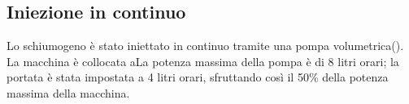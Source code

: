 
\subsection{Iniezione in continuo}
Lo schiumogeno è stato iniettato in continuo tramite una pompa volumetrica(). La macchina è collocata aLa potenza massima della pompa è di 8 litri orari; la portata è stata impostata a 4 litri orari, sfruttando così il 50\% della potenza massima della macchina.

\begin{figure}[htbp]
    \centering
{} \qquad   

\end{figure}
